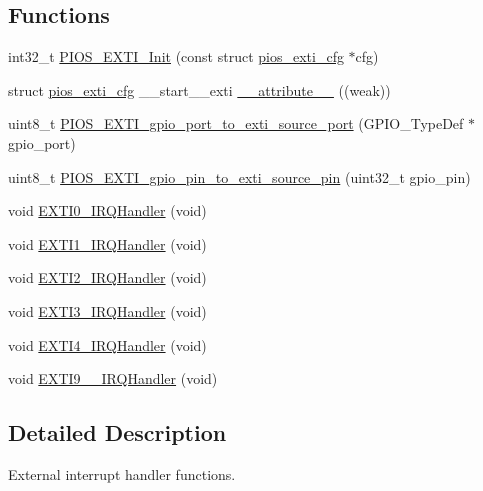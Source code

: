 \subsection*{\-Functions}
\begin{DoxyCompactItemize}
\item 
int32\-\_\-t \hyperlink{group___p_i_o_s___e_x_t_i_gaa35c400a680d3af7d1ec1a0a3f91d93f}{\-P\-I\-O\-S\-\_\-\-E\-X\-T\-I\-\_\-\-Init} (const struct \hyperlink{structpios__exti__cfg}{pios\-\_\-exti\-\_\-cfg} $\ast$cfg)
\item 
struct \hyperlink{structpios__exti__cfg}{pios\-\_\-exti\-\_\-cfg} \-\_\-\-\_\-start\-\_\-\-\_\-exti \hyperlink{group___p_i_o_s___e_x_t_i_ga5b4de0228d66143e17ab3388737b08f7}{\-\_\-\-\_\-attribute\-\_\-\-\_\-} ((weak))
\item 
uint8\-\_\-t \hyperlink{group___p_i_o_s___e_x_t_i_gaf9e6020d60052741dcfc23842da0a6b8}{\-P\-I\-O\-S\-\_\-\-E\-X\-T\-I\-\_\-gpio\-\_\-port\-\_\-to\-\_\-exti\-\_\-source\-\_\-port} (\-G\-P\-I\-O\-\_\-\-Type\-Def $\ast$gpio\-\_\-port)
\item 
uint8\-\_\-t \hyperlink{group___p_i_o_s___e_x_t_i_gac9299a06b0644f3775e000a1d9c500a8}{\-P\-I\-O\-S\-\_\-\-E\-X\-T\-I\-\_\-gpio\-\_\-pin\-\_\-to\-\_\-exti\-\_\-source\-\_\-pin} (uint32\-\_\-t gpio\-\_\-pin)
\item 
void \hyperlink{group___p_i_o_s___e_x_t_i_ga17e9789a29a87d2df54f12b94dd1a0b6}{\-E\-X\-T\-I0\-\_\-\-I\-R\-Q\-Handler} (void)
\item 
void \hyperlink{group___p_i_o_s___e_x_t_i_ga49cfdd46eb8d0ef3e1987514aa9343dc}{\-E\-X\-T\-I1\-\_\-\-I\-R\-Q\-Handler} (void)
\item 
void \hyperlink{group___p_i_o_s___e_x_t_i_gab5a1d9e9c8ef50e0cb9ddb5745a20a14}{\-E\-X\-T\-I2\-\_\-\-I\-R\-Q\-Handler} (void)
\item 
void \hyperlink{group___p_i_o_s___e_x_t_i_ga30c045de96d18ec9c67a7b9e4350920f}{\-E\-X\-T\-I3\-\_\-\-I\-R\-Q\-Handler} (void)
\item 
void \hyperlink{group___p_i_o_s___e_x_t_i_ga290cb997018c8d85d4b965b4a242842f}{\-E\-X\-T\-I4\-\_\-\-I\-R\-Q\-Handler} (void)
\item 
void \hyperlink{group___p_i_o_s___e_x_t_i_ga7b2096b8b2643286dc3a7e5110e5ae85}{\-E\-X\-T\-I9\-\_\-\_\-\-I\-R\-Q\-Handler} (void)
\end{DoxyCompactItemize}


\subsection{\-Detailed \-Description}
\-External interrupt handler functions. 

